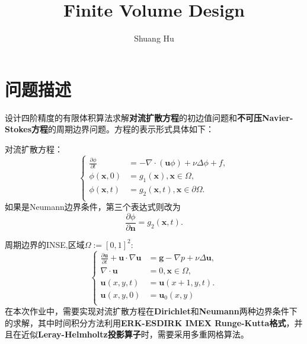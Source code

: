 \documentclass[UTF8]{ctexart}
\title{Finite Volume Design}
\author{Shuang Hu}
\theoremstyle{plain}
\theoremstyle{definition}
\theoremstyle{remark}
\newcommand{\pdfFrac}[2]{\frac{\partial #1}{\partial #2}}
\begin{document}
\maketitle
\section{问题描述}
设计四阶精度的有限体积算法求解\textbf{对流扩散方程}的初边值问题和\textbf{不可压Navier-Stokes方程}的周期边界问题。方程的表示形式具体如下：

对流扩散方程：
\begin{equation}
    \left\{
        \begin{aligned}
            \pdfFrac{\phi}{t}&=-\nabla\cdot(\mathbf{u}\phi)+\nu\Delta\phi+f,\\
            \phi(\mathbf{x},0)&=g_{1}(\mathbf{x}),\mathbf{x}\in\Omega,\\
            \phi(\mathbf{x},t)&=g_{2}(\mathbf{x},t),\mathbf{x}\in\partial\Omega.\\
        \end{aligned}
    \right.
\end{equation}
如果是Neumann边界条件，第三个表达式则改为
\begin{equation}
    \pdfFrac{\phi}{\mathbf{n}}=g_{2}(\mathbf{x},t).
\end{equation}

周期边界的INSE,区域$\Omega:=[0,1]^2$:
\begin{equation}
    \left\{
        \begin{aligned}
            \pdfFrac{\mathbf{u}}{t}+\mathbf{u}\cdot\nabla\mathbf{u}&=\mathbf{g}-\nabla p+\nu\Delta\mathbf{u},\\
            \nabla\cdot\mathbf{u}&=0,\mathbf{x}\in\Omega,\\
            \mathbf{u}(x,y,t)&=\mathbf{u}(x+1,y,t).\\
            \mathbf{u}(x,y,0)&=\mathbf{u}_{0}(x,y)\\
        \end{aligned}
    \right.
\end{equation}
在本次作业中，需要实现对流扩散方程在\textbf{Dirichlet}和\textbf{Neumann}两种边界条件下的求解，其中时间积分方法利用\textbf{ERK-ESDIRK IMEX Runge-Kutta格式}，并且在近似\textbf{Leray-Helmholtz投影算子}时，需要采用多重网格算法。
\end{document}
